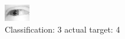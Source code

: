 \begin{figure}[h!]
\begin{center}
\includegraphics[width=0.60\columnwidth]{figures/ID2405_class_3_target_4.png}
\end{center}
\caption{ Classification: 3 actual target: 4}
\label{fig:ID2405_class_3_target_4}
\end{figure}
